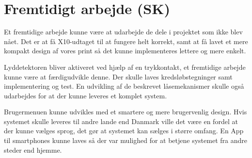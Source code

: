\chapter{Fremtidigt arbejde (SK)}

Et fremtidige arbejde kunne være at udarbejde de dele i projektet som ikke blev nået. Det er at få X10-udtaget til at fungere helt korrekt, samt at få lavet et mere kompakt design af vores print så det kunne implementeres lettere og mere enkelt. 

Lyddetektoren bliver aktiveret ved hjælp af en trykkontakt, et fremtidige arbejde kunne være at færdigudvikle denne. Der skulle laves kredsløbstegninger samt implementering og test. En udvikling af de beskrevet låsemekanismer skulle også udarbejdes for at der kunne leveres et komplet system.

Brugermenuen kunne udvikles med et smartere og mere brugervenlig design. Hvis systemet skulle leveres til andre lande end Danmark ville det være en fordel at der kunne vælges sprog, det gør at systemet kan sælges i større omfang. En App til smartphones kunne laves så der var mulighed for at betjene systemet fra andre steder end hjemme.